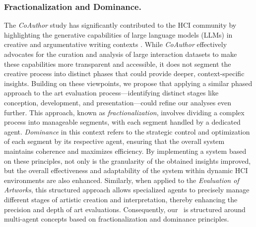 \subsubsection{Fractionalization and Dominance.}
The \textit{CoAuthor} study has significantly contributed to the HCI community by highlighting the generative capabilities of large language models  (LLMs) in creative and argumentative writing contexts \cite{lee2022coauthor}. While \textit{CoAuthor} effectively advocates for the curation and analysis of large interaction datasets to make these capabilities more transparent and accessible, it does not segment the creative process into distinct phases that could provide deeper, context-specific insights. Building on these viewpoints, we propose that applying a similar phased approach to the art evaluation process—identifying distinct stages like conception, development, and presentation—could refine our analyses even further. This approach, known as \textit{fractionalization}, involves dividing a complex process into manageable segments, with each segment handled by a dedicated agent. \textit{Dominance} in this context refers to the strategic control and optimization of each segment by its respective agent, ensuring that the overall system maintains coherence and maximizes efficiency. By implementing a system based on these principles, not only is the granularity of the obtained insights improved, but the overall effectiveness and adaptability of the system within dynamic HCI environments are also enhanced. Similarly, when applied to the \textit{Evaluation of Artworks}, this structured approach allows specialized agents to precisely manage different stages of artistic creation and interpretation, thereby enhancing the precision and depth of art evaluations. Consequently, our \dataset~is structured around multi-agent concepts based on fractionalization and dominance principles.
